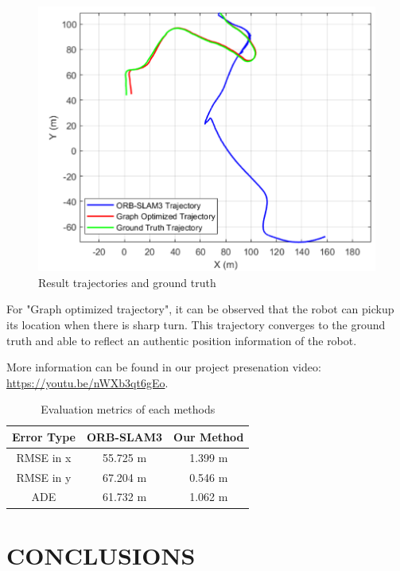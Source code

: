 \documentclass[letterpaper, 10 pt, conference]{ieeeconf}  %
\begin{document}
\begin{figure}[ht]
\centering
\includegraphics[scale=0.36]{result.png}
\caption{Result trajectories and ground truth}
\label{fig_result}
\end{figure}
For "Graph optimized trajectory", it can be observed that the robot can pickup its location when there is sharp turn. This trajectory converges to the ground truth and able to reflect an authentic position information of the robot.

More information can be found in our project presenation video: \href{https://youtu.be/nWXb3qt6gEo}{https://youtu.be/nWXb3qt6gEo}.

\begin{table}[ht]
\caption{Evaluation metrics of each methods}
\label{table_rmse}
\begin{center}
\begin{tabular}{||c|c|c||}
\hline
 Error Type & ORB-SLAM3 & Our Method\\
\hline
RMSE in x & 55.725 m & 1.399 m\\
\hline
RMSE in y &67.204 m & 0.546 m\\
\hline
ADE & 61.732 m  & 1.062 m \\
\hline
\end{tabular}
\end{center}
\end{table}


\section{CONCLUSIONS}
\end{document}
